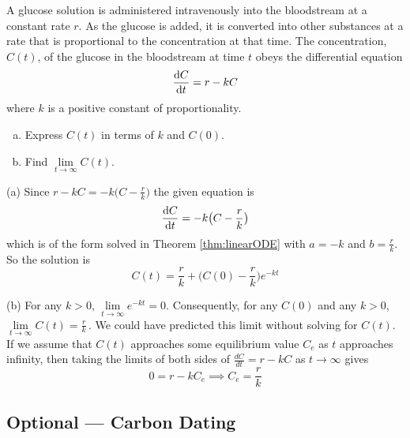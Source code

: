 \goodbreak
\begin{eg}\label{eg:SDEgluclose}
A glucose solution is administered
intravenously into the bloodstream at a constant rate $r$. As the glucose
is added, it is converted into other substances at a rate that is proportional
to the concentration at that time. The concentration, $C(t)$, of the glucose
in the bloodstream at time $t$ obeys the differential equation
$$
\diff{C}{t}=r-kC
$$
where $k$ is a positive constant of proportionality.
\begin{enumerate}[(a)]
\item Express $C(t)$ in terms of $k$ and $C(0)$.
\item Find $\lim\limits_{t\rightarrow\infty} C(t)$.
\end{enumerate}

\soln (a) Since $r-kC=-k\big(C-\frac{r}{k}\big)$ the given equation is
\begin{equation*}
\diff{C}{t}=-k\big(C-\frac{r}{k}\big)
\end{equation*}
which is of the form solved in Theorem \ref{thm:linearODE}
with $a=-k$ and $b=\frac{r}{k}$. So the solution is
\begin{equation*}
C(t)=\frac{r}{k}+\Big(C(0)-\frac{r}{k}\Big)e^{-kt}
\end{equation*}

\noindent(b) For any $k>0$, $\lim\limits_{t\rightarrow\infty} e^{-kt}=0$.
Consequently, for any $C(0)$ and any $k>0$,
\hbox{$\lim\limits_{t\rightarrow\infty} C(t)=\frac{r}{k}$}$\,$.
We could have predicted this limit without solving for $C(t)$. If we
assume that $C(t)$ approaches some equilibrium value $C_e$ as $t$ approaches
infinity, then taking the limits of both sides of $\frac{dC}{dt}=r-kC$
as $t\rightarrow\infty$ gives
\begin{equation*}
0=r-kC_e\implies C_e=\frac{r}{k}
\end{equation*}
\end{eg}

\subsection{Optional --- Carbon Dating}

